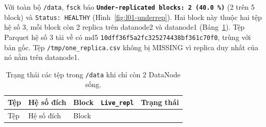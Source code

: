 \documentclass[
  12pt,
  a4paper,
]{report}
\begin{document}
Với toàn bộ \texttt{/data}, \texttt{fsck} báo
\textbf{\texttt{Under-replicated\ blocks:}\allowbreak{}\texttt{\ 2\ (40.}\allowbreak{}\texttt{0\ \%)}\allowbreak{}}
(2 trên 5 block) và \texttt{Status:\ HEALTHY}
(Hình~\ref{fig:l01-underrep}). Hai block này thuộc hai tệp hệ số 3, mỗi
block còn 2 replica trên datanode2 và datanode1
(Bảng~\ref{tbl:l01-underrep}). Tệp Parquet hệ số 3 tải về có md5
\texttt{10dff36f5a2fc325274438bf361c70f0}\allowbreak{}, trùng với bản
gốc. Tệp
\texttt{/}\allowbreak{}\texttt{tmp/}\allowbreak{}\texttt{one\_}\allowbreak{}\texttt{replica.}\allowbreak{}\texttt{csv}\allowbreak{}
không bị MISSING vì replica duy nhất của nó nằm trên datanode1.

\begin{longtable}[]{@{}
  >{\raggedright\arraybackslash}p{}
  >{\raggedright\arraybackslash}p{}
  >{\raggedright\arraybackslash}p{}
  >{\raggedright\arraybackslash}p{}
  >{\raggedright\arraybackslash}p{}@{}}
\caption{\label{tbl:l01-underrep}Trạng thái các tệp trong \texttt{/data}
khi chỉ còn 2 DataNode sống.}\tabularnewline
\toprule\noalign{}
\begin{minipage}[b]{\linewidth}\raggedright
Tệp
\end{minipage} & \begin{minipage}[b]{\linewidth}\raggedright
Hệ số đích
\end{minipage} & \begin{minipage}[b]{\linewidth}\raggedright
Block
\end{minipage} & \begin{minipage}[b]{\linewidth}\raggedright
\texttt{Live\_repl}
\end{minipage} & \begin{minipage}[b]{\linewidth}\raggedright
Trạng thái
\end{minipage} \\
\midrule\noalign{}
\endfirsthead
\toprule\noalign{}
\begin{minipage}[b]{\linewidth}\raggedright
Tệp
\end{minipage} & \begin{minipage}[b]{\linewidth}\raggedright
Hệ số đích
\end{minipage} & \begin{minipage}[b]{\linewidth}\raggedright
Block
\end{minipage} & \begin{minipage}[b]{\linewidth}\raggedright

\end{minipage}
\end{longtable}
\end{document}

